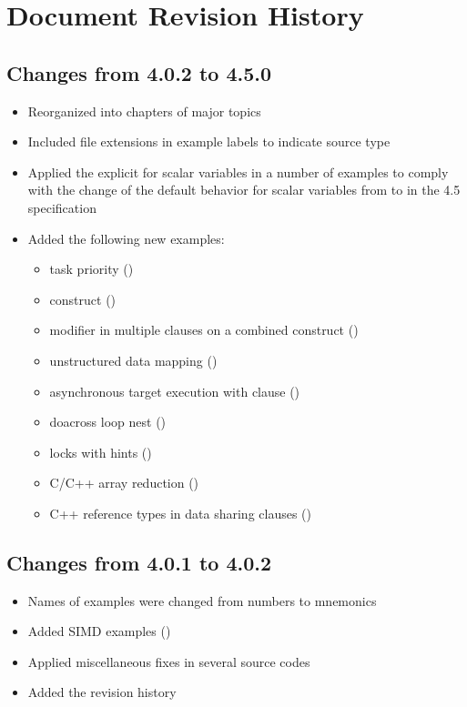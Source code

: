 \chapter{Document Revision History}
\label{chap:history}

\section{Changes from 4.0.2 to 4.5.0}
\begin{itemize}
\item Reorganized into chapters of major topics
\item Included file extensions in example labels to indicate source type
\item Applied the explicit  for scalar variables 
in a number of examples to comply with 
the change of the default behavior for scalar variables from 
 to  in the 4.5 specification
\item Added the following new examples:
\begin{itemize}
\item task priority ()
\item {} construct ()
\item {} modifier in multiple  clauses on
a combined construct ()
\item unstructured data mapping ()
\item asynchronous target execution with  clause ()
\item doacross loop nest ()
\item locks with hints ()
\item C/C++ array reduction ()
\item C++ reference types in data sharing clauses ()
\end{itemize}
\end{itemize}

\section{Changes from 4.0.1 to 4.0.2}

\begin{itemize}
\item Names of examples were changed from numbers to mnemonics
\item Added SIMD examples ()
\item Applied miscellaneous fixes in several source codes
\item Added the revision history
\end{itemize}

